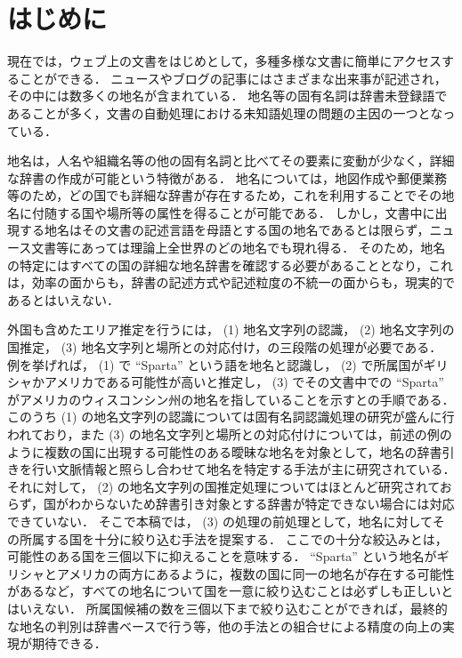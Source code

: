 \documentclass[japanese]{jnlp_1.4}
\begin{document}
\maketitle

\section{はじめに}
\label{sec:introduction}

現在では，ウェブ上の文書をはじめとして，多種多様な文書に簡単にアクセスすることができる．
ニュースやブログの記事にはさまざまな出来事が記述され，その中には数多くの地名が含まれている．
地名等の固有名詞は辞書未登録語であることが多く，文書の自動処理における未知語処理の問題の主因の一つとなっている．

地名は，人名や組織名等の他の固有名詞と比べてその要素に変動が少なく，詳細な辞書の作成が可能という特徴がある．
地名については，地図作成や郵便業務等のため，どの国でも詳細な辞書が存在するため，これを利用することでその地名に付随する国や場所等の属性を得ることが可能である．
しかし，文書中に出現する地名はその文書の記述言語を母語とする国の地名であるとは限らず，ニュース文書等にあっては理論上全世界のどの地名でも現れ得る．
そのため，地名の特定にはすべての国の詳細な地名辞書を確認する必要があることとなり，これは，効率の面からも，辞書の記述方式や記述粒度の不統一の面からも，現実的であるとはいえない．

外国も含めたエリア推定を行うには， (1) 地名文字列の認識， (2) 地名文字列の国推定， (3) 地名文字列と場所との対応付け，の三段階の処理が必要である．
例を挙げれば， (1) で ``Sparta'' という語を地名と認識し， (2) で所属国がギリシャかアメリカである可能性が高いと推定し， (3) でその文書中での ``Sparta'' がアメリカのウィスコンシン州の地名を指していることを示すとの手順である．
このうち (1) の地名文字列の認識については固有名詞認識処理の研究が盛んに行われており，また (3) の地名文字列と場所との対応付けについては，前述の例のように複数の国に出現する可能性のある曖昧な地名を対象として，地名の辞書引きを行い文脈情報と照らし合わせて地名を特定する手法が主に研究されている．
それに対して， (2) の地名文字列の国推定処理についてはほとんど研究されておらず，国がわからないため辞書引き対象とする辞書が特定できない場合には対応できていない．
そこで本稿では， (3) の処理の前処理として，地名に対してその所属する国を十分に絞り込む手法を提案する．
ここでの十分な絞込みとは，可能性のある国を三個以下に抑えることを意味する．
``Sparta'' という地名がギリシャとアメリカの両方にあるように，複数の国に同一の地名が存在する可能性があるなど，すべての地名について国を一意に絞り込むことは必ずしも正しいとはいえない．
所属国候補の数を三個以下まで絞り込むことができれば，最終的な地名の判別は辞書ベースで行う等，他の手法との組合せによる精度の向上の実現が期待できる．
\end{document}
